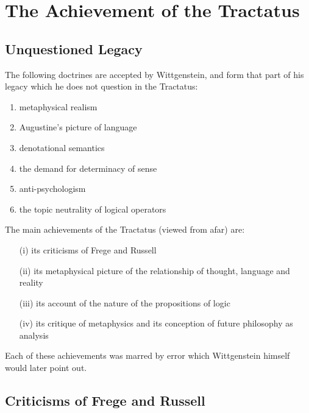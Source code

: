 \chapter{The Achievement of the Tractatus}

\section{Unquestioned Legacy}

The following doctrines are accepted by Wittgenstein, and form that part of his legacy which he does not question in the Tractatus: 
\begin{enumerate}
\item metaphysical realism
\item Augustine's picture of language
\item denotational semantics
\item the demand for determinacy of sense
\item anti-psychologism
\item the topic neutrality of logical operators
\end{enumerate}


The main achievements of the Tractatus (viewed from afar) are:
\begin{itemize}
\item[(i)] its criticisms of Frege and Russell
\item[(ii)] its metaphysical picture of the relationship of thought, language and reality
\item[(iii)] its account of the nature of the propositions of logic
\item[(iv)] its critique of metaphysics and its conception of future philosophy as analysis
\end{itemize}

Each of these achievements was marred by error which Wittgenstein himself would later point out.


\section{Criticisms of Frege and Russell}


